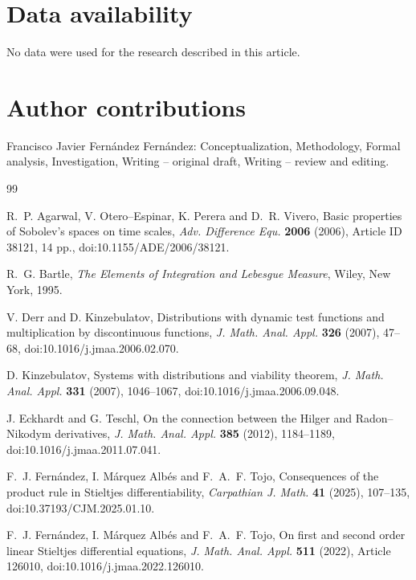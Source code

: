 \documentclass[preprint,12pt]{elsarticle}
\newenvironment{revision}{\begingroup\color{red}}{\endgroup}
\newenvironment{revision}{}{}
\theoremstyle{definition}
\theoremstyle{remark}
\begin{document}
\section*{Data availability}
No data were used for the research described in this article.

\section*{Author contributions}
Francisco Javier Fern\'andez Fern\'andez: Conceptualization, Methodology, Formal analysis, Investigation, Writing -- original draft, Writing -- review and editing.

\begin{thebibliography}{99}

R.~P. Agarwal, V. Otero--Espinar, K. Perera and D.~R. Vivero,
Basic properties of Sobolev's spaces on time scales,
\emph{Adv. Difference Equ.} \textbf{2006} (2006), Article ID 38121, 14 pp., doi:10.1155/ADE/2006/38121.

R.~G. Bartle,
\emph{The Elements of Integration and Lebesgue Measure},
Wiley, New York, 1995.

V. Derr and D. Kinzebulatov,
Distributions with dynamic test functions and multiplication by discontinuous functions,
\emph{J. Math. Anal. Appl.} \textbf{326} (2007), 47--68, doi:10.1016/j.jmaa.2006.02.070.

D. Kinzebulatov,
Systems with distributions and viability theorem,
\emph{J. Math. Anal. Appl.} \textbf{331} (2007), 1046--1067, doi:10.1016/j.jmaa.2006.09.048.

J. Eckhardt and G. Teschl,
On the connection between the Hilger and Radon--Nikodym derivatives,
\emph{J. Math. Anal. Appl.} \textbf{385} (2012), 1184--1189, doi:10.1016/j.jmaa.2011.07.041.

F.~J. Fern\'andez, I. M\'arquez Alb\'es and F.~A.~F. Tojo,
Consequences of the product rule in Stieltjes differentiability,
\emph{Carpathian J. Math.} \textbf{41} (2025), 107--135,
doi:10.37193/CJM.2025.01.10.

\begin{revision}
F.~J. Fern\'andez, I. M\'arquez Alb\'es and F.~A.~F. Tojo,
On first and second order linear Stieltjes differential equations,
\emph{J. Math. Anal. Appl.} \textbf{511} (2022), Article 126010,
doi:10.1016/j.jmaa.2022.126010.
\end{revision}


\end{thebibliography}
\end{document}
